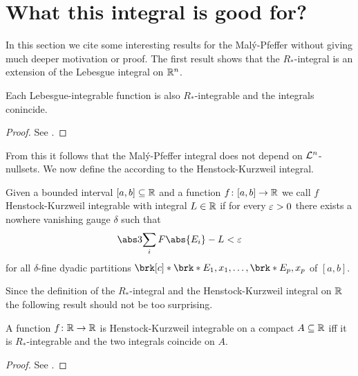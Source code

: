 \section{What this integral is good for?}

In this section we cite some interesting results for the Malý-Pfeffer without giving much deeper motivation or proof. The first result shows that the $R_*$-integral is an extension of the Lebesgue integral on $\mathbb{R}^n$.

\begin{proposition}
Each Lebesgue-integrable function is also $R_*$-integrable and the integrals conincide.
\end{proposition}
\begin{proof}
See \cite[Proposition 3.5]{Pfe2016}.
\end{proof}

\noindent
From this it follows that the Malý-Pfeffer integral does not depend on $\mathcal{L}^n$-nullsets. We now define the according to \cite[Appendix H]{Coh2013} the Henstock-Kurzweil integral.

\begin{definition}
Given a bounded  interval $[a,b]\subseteq\mathbb{R}$ and a function $f\colon[a,b]\to\mathbb{R}$ we call $f$ Henstock-Kurzweil integrable with integral $L\in\mathbb{R}$ if for every $\varepsilon>0$ there exists a nowhere vanishing gauge $\delta$ such that
\begin{align*}
	\abs3{\sum_iF\abs{E_i}-L}<\e
\end{align*}
for all $\delta$-fine dyadic partitions $\brk[c]*{\brk*{E_1,x_1},\dots,\brk*{E_p,x_p}}$ of $[a,b]$.
\end{definition}

Since the definition of the $R_*$-integral and the Henstock-Kurzweil integral on $\mathbb{R}$ the following result should not be too surprising. 

\begin{proposition}
A function $f\colon\mathbb{R}\to\mathbb{R}$ is Henstock-Kurzweil integrable on a compact $A\subseteq\mathbb{R}$ iff it is $R_*$-integrable and the two integrals coincide on $A$.
\end{proposition}
\begin{proof}
See \cite[Proposition 3.6]{Pfe2016}.
\end{proof}

